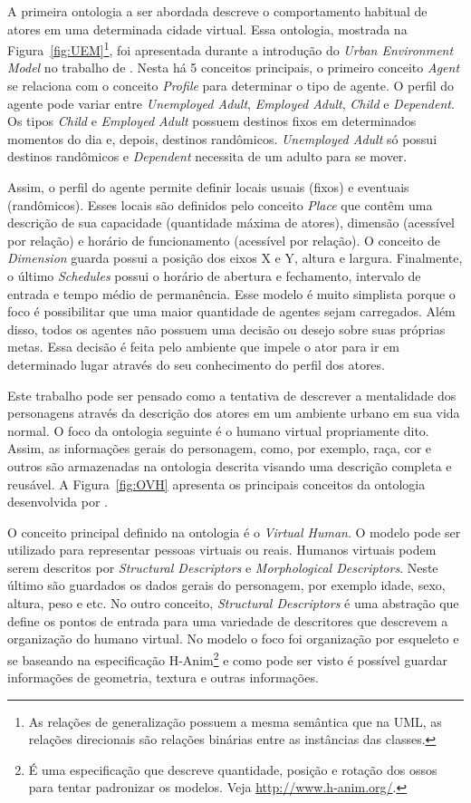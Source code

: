 A primeira ontologia a ser abordada descreve o comportamento habitual de
atores em uma determinada cidade virtual. Essa ontologia, mostrada na
Figura~\ref{fig:UEM}\footnote{As relações de generalização possuem a mesma
semântica que na UML, as relações direcionais são relações binárias entre as
instâncias das classes.}, foi apresentada durante a introdução do \emph{Urban
Environment Model} no trabalho de \citet{paiva2005ontology}. Nesta há 5
conceitos principais, o primeiro conceito \emph{Agent} se relaciona com o
conceito \emph{Profile} para determinar o tipo de agente. O perfil do agente
pode variar entre \emph{Unemployed Adult}, \emph{Employed Adult}, \emph{Child}
e \emph{Dependent}. Os tipos \emph{Child} e \emph{Employed Adult} possuem
destinos fixos em determinados momentos do dia e, depois, destinos randômicos.
\emph{Unemployed Adult} só possui destinos randômicos e \emph{Dependent}
necessita de um adulto para se mover.

Assim, o perfil do agente permite definir locais usuais (fixos) e eventuais
(randômicos). Esses locais são definidos pelo conceito \emph{Place} que contêm
uma descrição de sua capacidade (quantidade máxima de atores), dimensão
(acessível por relação) e horário de funcionamento (acessível por relação). O
conceito de \emph{Dimension} guarda possui a posição dos eixos X e Y, altura e
largura. Finalmente, o último \emph{Schedules} possui o horário de abertura e
fechamento, intervalo de entrada e tempo médio de permanência. Esse modelo é
muito simplista porque o foco é possibilitar que uma maior quantidade de
agentes sejam carregados. Além disso, todos os agentes não possuem uma decisão
ou desejo sobre suas próprias metas. Essa decisão é feita pelo ambiente que
impele o ator para ir em determinado lugar através do seu conhecimento do
perfil dos atores.

Este trabalho pode ser pensado como a tentativa de descrever a mentalidade dos
personagens através da descrição dos atores em um ambiente urbano em sua vida
normal. O foco da ontologia seguinte é o humano virtual propriamente dito.
Assim, as informações gerais do personagem, como, por exemplo, raça, cor e
outros são armazenadas na ontologia descrita visando uma descrição completa e
reusável. A Figura~\ref{fig:OVH} apresenta os principais conceitos da
ontologia desenvolvida por \citet{Gutierrez:2007:OVH:1229160.1229164}.

O conceito principal definido na ontologia é o \emph{Virtual Human}. O modelo
pode ser utilizado para representar pessoas virtuais ou reais. Humanos
virtuais podem serem descritos por \emph{Structural Descriptors} e
\emph{Morphological Descriptors}. Neste último são guardados os dados gerais
do personagem, por exemplo idade, sexo, altura, peso e etc. No outro conceito,
\emph{Structural Descriptors} é uma abstração que define os pontos de entrada
para uma variedade de descritores que descrevem a organização do humano
virtual. No modelo o foco foi organização por esqueleto e se baseando na
especificação H-Anim\footnote{É uma especificação que descreve quantidade,
posição e rotação dos ossos para tentar padronizar os modelos.
Veja \url{http://www.h-anim.org/}.} e como pode ser visto é possível guardar
informações de geometria, textura e outras informações.

